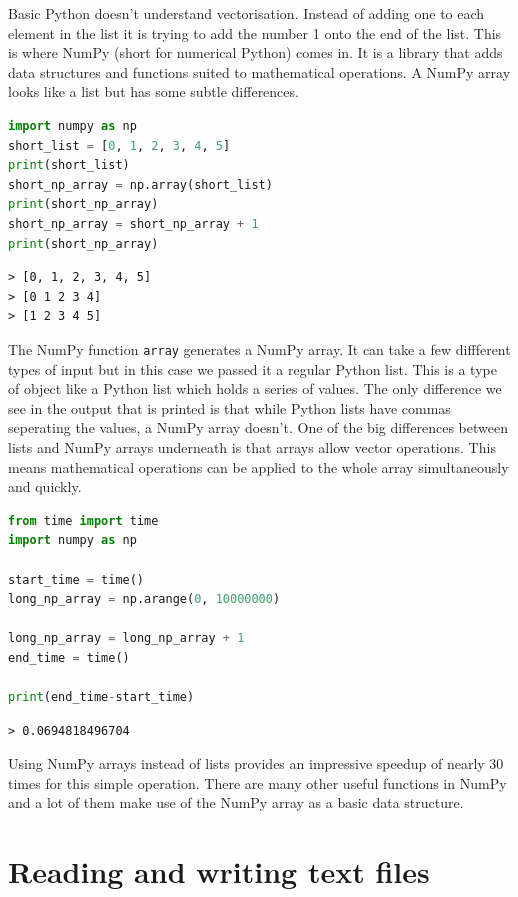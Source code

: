 	Basic Python doesn't understand vectorisation. Instead of adding one to each element in the list it is trying to add the number 1 onto the end of the list. This is where NumPy (short for numerical Python) comes in. It is a library that adds data structures and functions suited to mathematical operations. A NumPy array looks like a list but has some subtle differences.

	\begin{lstlisting}[language=Python]
import numpy as np
short_list = [0, 1, 2, 3, 4, 5]
print(short_list)
short_np_array = np.array(short_list)
print(short_np_array)
short_np_array = short_np_array + 1
print(short_np_array)\end{lstlisting}

	\begin{verbatim}
> [0, 1, 2, 3, 4, 5]
> [0 1 2 3 4]
> [1 2 3 4 5]
	\end{verbatim}

	The NumPy function \texttt{array} generates a NumPy array. It can take a few diffferent types of input but in this case we passed it a regular Python list. This is a type of object like a Python list which holds a series of values. The only difference we see in the output that is printed is that while Python lists have commas seperating the values, a NumPy array doesn't. One of the big differences between lists and NumPy arrays underneath is that arrays allow vector operations. This means mathematical operations can be applied to the whole array simultaneously and quickly.

	\begin{lstlisting}[language=Python]
from time import time
import numpy as np

start_time = time()
long_np_array = np.arange(0, 10000000)

long_np_array = long_np_array + 1
end_time = time()

print(end_time-start_time)\end{lstlisting}
	\begin{verbatim}
> 0.0694818496704 \end{verbatim}

	Using NumPy arrays instead of lists provides an impressive speedup of nearly 30 times for this simple operation. There are many other useful functions in NumPy and a lot of them make use of the NumPy array as a basic data structure.

\section{Reading and writing text files}
